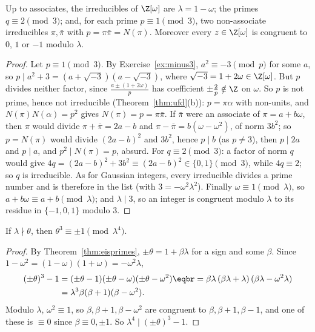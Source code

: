 \begin{theorem}\label{thm:eisprimes}
Up to associates, the irreducibles of $\Z[\omega]$ are $\lambda=1-\omega$; the primes $q\equiv2\pmod3$; and, for each prime $p\equiv1\pmod3$, two non-associate irreducibles $\pi,\bar\pi$ with $p=\pi\bar\pi=N(\pi)$. Moreover every $z\in\Z[\omega]$ is congruent to $0$, $1$ or $-1$ modulo $\lambda$.
\end{theorem}
\begin{proof}
Let $p\equiv1\pmod3$. By Exercise~\ref{ex:minus3}, $a^2\equiv-3\pmod p$ for some $a$, so $p\mid a^2+3=(a+\sqrt{-3})(a-\sqrt{-3})$, where $\sqrt{-3}=1+2\omega\in\Z[\omega]$. But $p$ divides neither factor, since $\frac{a\pm(1+2\omega)}p$ has coefficient $\pm\frac2p\notin\Z$ on $\omega$. So $p$ is not prime, hence not irreducible (Theorem~\ref{thm:ufd}(b)): $p=\pi\alpha$ with non-units, and $N(\pi)N(\alpha)=p^2$ gives $N(\pi)=p=\pi\bar\pi$. If $\bar\pi$ were an associate of $\pi=a+b\omega$, then $\pi$ would divide $\pi+\bar\pi=2a-b$ and $\pi-\bar\pi=b(\omega-\omega^2)$, of norm $3b^2$; so $p=N(\pi)$ would divide $(2a-b)^2$ and $3b^2$, hence $p\mid b$ (as $p\ne3$), then $p\mid2a$ and $p\mid a$, and $p^2\mid N(\pi)=p$, absurd. For $q\equiv2\pmod3$: a factor of norm $q$ would give $4q=(2a-b)^2+3b^2\equiv(2a-b)^2\in\{0,1\}\pmod3$, while $4q\equiv2$; so $q$ is irreducible. As for Gaussian integers, every irreducible divides a prime number and is therefore in the list (with $3=-\omega^2\lambda^2$).
Finally $\omega\equiv1\pmod\lambda$, so $a+b\omega\equiv a+b\pmod\lambda$; and $\lambda\mid3$, so an integer is congruent modulo $\lambda$ to its residue in $\{-1,0,1\}$ modulo $3$.
\end{proof}

\begin{lemma}\label{lem:cube}
If $\lambda\nmid\theta$, then $\theta^3\equiv\pm1\pmod{\lambda^4}$.
\end{lemma}
\begin{proof}
By Theorem~\ref{thm:eisprimes}, $\pm\theta=1+\beta\lambda$ for a sign and some $\beta$. Since $1-\omega^2=(1-\omega)(1+\omega)=-\omega^2\lambda$,
\[
\begin{aligned}(\pm\theta)^3-1&=(\pm\theta-1)(\pm\theta-\omega)(\pm\theta-\omega^2)\eqbr=\beta\lambda\,(\beta\lambda+\lambda)\,(\beta\lambda-\omega^2\lambda)\\&=\lambda^3\beta(\beta+1)(\beta-\omega^2).\end{aligned}
\]
Modulo $\lambda$, $\omega^2\equiv1$, so $\beta,\beta+1,\beta-\omega^2$ are congruent to $\beta,\beta+1,\beta-1$, and one of these is $\equiv0$ since $\beta\equiv0,\pm1$. So $\lambda^4\mid(\pm\theta)^3-1$.
\end{proof}

